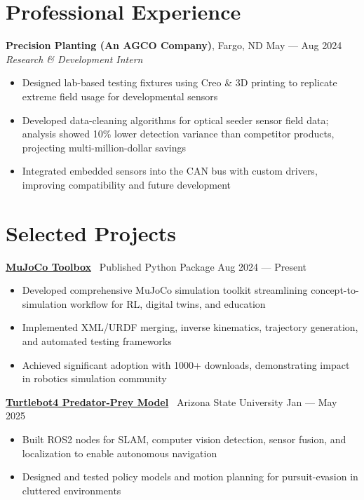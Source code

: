 \documentclass[10pt]{article}
\begin{document}
\section*{Professional Experience}
\textbf{Precision Planting (An AGCO Company)}, Fargo, ND \hfill May --- Aug 2024 \\
\textit{Research \& Development Intern}
\begin{itemize}
  \item Designed lab-based testing fixtures using Creo \& 3D printing to replicate extreme field usage for developmental sensors
  \item Developed data-cleaning algorithms for optical seeder sensor field data; analysis showed 10\% lower detection variance than competitor products, projecting multi-million-dollar savings
  \item Integrated embedded sensors into the CAN bus with custom drivers, improving compatibility and future development
\end{itemize}

\section*{Selected Projects}
\textbf{\href{https://github.com/MGross21/mujoco-toolbox}{MuJoCo Toolbox}} \textbar\ Published Python Package \hfill Aug 2024 --- Present
\begin{itemize}
  \item Developed comprehensive MuJoCo simulation toolkit streamlining concept-to-simulation workflow for RL, digital twins, and education
  \item Implemented XML/URDF merging, inverse kinematics, trajectory generation, and automated testing frameworks
  \item Achieved significant adoption with 1000+ downloads, demonstrating impact in robotics simulation community
\end{itemize}

\textbf{\href{https://ASU-RAS598-2025-S-TEAM02.github.io}{Turtlebot4 Predator-Prey Model}} \textbar\ Arizona State University \hfill Jan --- May 2025
\begin{itemize}
  \item Built ROS2 nodes for SLAM, computer vision detection, sensor fusion, and localization to enable autonomous navigation
  \item Designed and tested policy models and motion planning for pursuit-evasion in cluttered environments
\end{itemize}
\end{document}

